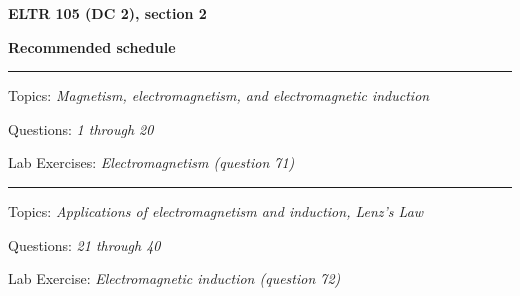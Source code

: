 
\centerline{\bf ELTR 105 (DC 2), section 2} \bigskip 
 
\vskip 10pt

\noindent
{\bf Recommended schedule}

\vskip 5pt

\hrule \vskip 5pt
\noindent
{}

\hskip 10pt Topics: {\it Magnetism, electromagnetism, and electromagnetic induction}
 
\hskip 10pt Questions: {\it 1 through 20}
 
\hskip 10pt Lab Exercises: {\it Electromagnetism (question 71)}
 






\vskip 10pt
\hrule \vskip 5pt
\noindent
{}

\hskip 10pt Topics: {\it Applications of electromagnetism and induction, Lenz's Law}
 
\hskip 10pt Questions: {\it 21 through 40}
 
\hskip 10pt Lab Exercise: {\it Electromagnetic induction (question 72)}
 




